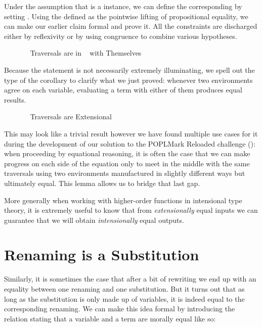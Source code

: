 Under the assumption that  is a  instance, we can define the
corresponding   by setting
.
Using  the  defined as the pointwise lifting of propositional equality,
we can make our earlier claim formal and prove it. All the constraints are discharged
either by reflexivity or by using congruence to combine various hypotheses.

\begin{figure}[h]
\caption{~ Traversals are in ~ with Themselves\label{fig:synselfsim}}
\end{figure}

Because the  statement is not necessarily extremely illuminating, we spell
out the type of the corollary to clarify what we just proved: whenever two environments
agree on each variable, evaluating a term with either of them produces equal results.

\begin{figure}[h]
\caption{~ Traversals are Extensional\label{fig:synextensional}}
\end{figure}

This may look like a trivial result however we have found multiple use cases
for it during the development of our solution to the POPLMark Reloaded
challenge (\citeyear{poplmark2}): when proceeding by equational reasoning,
it is often the case that we can make progress on each side of the equation
only to meet in the middle with the same traversals using two environments
manufactured in slightly different ways but ultimately equal.
This lemma allows us to bridge that last gap.

More generally when working with higher-order functions in intensional
type theory, it is extremely useful to know that from \emph{extensionally}
equal inputs we can guarantee that we will obtain \emph{intensionally}
equal outputs.

\section{Renaming is a Substitution}

Similarly, it is sometimes the case that after a bit of rewriting we end
up with an equality between one renaming and one substitution. But it turns
out that as long as the substitution is only made up of variables, it is
indeed equal to the corresponding renaming. We can make this idea formal
by introducing the  relation stating that a variable and a
term are morally equal like so:

